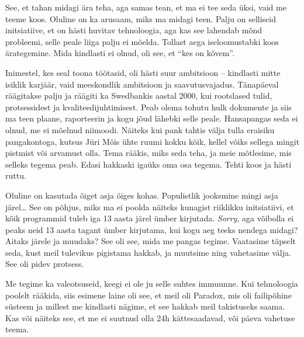 
See, et tahan midagi ära teha, aga samas tean, et ma ei tee seda üksi, 
vaid me teeme koos. Oluline on ka arusaam, miks ma midagi teen. Palju on selliseid initsiatiive, et on 
hästi huvitav tehnoloogia, aga kas see lahendab mõnd probleemi, selle peale liiga palju ei mõelda. Tollast aega iseloomustabki koos ärategemine. Mida 
kindlasti ei olnud, oli see, et \enquote{kes on kõvem}.

Inimestel, kes seal toona töötasid, oli hästi suur ambitsioon --
kindlasti mitte isiklik karjäär, vaid meeskondlik ambitsioon ja 
saavutusvajadus. Tänapäeval räägitakse palju ja räägiti ka Swedbankis 
aastal 2000, kui rootslased tulid, protsessidest ja kvaliteedijuhtimisest. Peab 
olema tohutu hulk dokumente ja siis ma teen plaane, raporteerin ja 
kogu jõud lähebki selle peale. Hansapangas seda ei olnud, me ei mõelnud niimoodi. Näiteks kui pank tahtis 
välja tulla eraisiku pangakontoga, kutsus Jüri Mõis 
ühte ruumi kokku kõik, kellel võiks sellega mingit pistmist või 
arvamust olla. Tema rääkis, miks seda teha, ja meie mõtlesime, mis selleks tegema 
peab. Edasi hakkaski igaüks oma osa tegema. Tehti koos ja 
hästi ruttu. 


Oluline on kasutada õiget asja õiges kohas. Populistlik jooksmine 
mingi asja järel\ldots{ }See on põhjus, miks ma ei poolda näiteks kunagist riiklikku initsiatiivi, 
et kõik programmid tuleb iga 13 aasta järel ümber 
kirjutada. \emph{Sorry}, aga võibolla ei peaks neid 13 aasta tagant ümber 
kirjutama, kui kogu aeg teeks nendega midagi? Aitaks järele ja muudaks? See 
oli see, mida me pangas tegime. Vaatasime täpselt seda, kust meil tulevikus 
pigistama hakkab, ja muutsime ning vahetasime välja. See oli pidev protsess. 


Me tegime ka valeotsuseid, keegi ei ole ju selle suhtes immuunne. 
Kui tehnoloogia poolelt rääkida, siis esimene laine oli see, et meil oli 
Paradox, mis oli failipõhine süsteem ja millest me kindlasti 
nägime, et see hakkab meil takistuseks saama. Kas või näiteks see, et me ei 
suutnud olla 24h kättesaadavad, või päeva vahetuse teema. 

